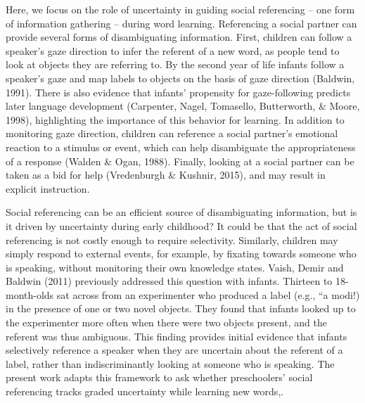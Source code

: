 \documentclass[10pt, letterpaper]{article}
\begin{document}
Here, we focus on the role of uncertainty in guiding social referencing
-- one form of information gathering -- during word learning.
Referencing a social partner can provide several forms of disambiguating
information. First, children can follow a speaker's gaze direction to
infer the referent of a new word, as people tend to look at objects they
are referring to. By the second year of life infants follow a speaker's
gaze and map labels to objects on the basis of gaze direction (Baldwin,
1991). There is also evidence that infants' propensity for
gaze-following predicts later language development (Carpenter, Nagel,
Tomasello, Butterworth, \& Moore, 1998), highlighting the importance of
this behavior for learning. In addition to monitoring gaze direction,
children can reference a social partner's emotional reaction to a
stimulus or event, which can help disambiguate the appropriateness of a
response (Walden \& Ogan, 1988). Finally, looking at a social partner
can be taken as a bid for help (Vredenburgh \& Kushnir, 2015), and may
result in explicit instruction.

Social referencing can be an efficient source of disambiguating
information, but is it driven by uncertainty during early childhood? It
could be that the act of social referencing is not costly enough to
require selectivity. Similarly, children may simply respond to external
events, for example, by fixating towards someone who is speaking,
without monitoring their own knowledge states. Vaish, Demir and Baldwin
(2011) previously addressed this question with infants. Thirteen to
18-month-olds sat across from an experimenter who produced a label
(e.g., ``a modi!) in the presence of one or two novel objects. They
found that infants looked up to the experimenter more often when there
were two objects present, and the referent was thus ambiguous. This
finding provides initial evidence that infants selectively reference a
speaker when they are uncertain about the referent of a label, rather
than indiscriminantly looking at someone who is speaking. The present
work adapts this framework to ask whether preschoolers' social
referencing tracks graded uncertainty while learning new words,.
\end{document}
